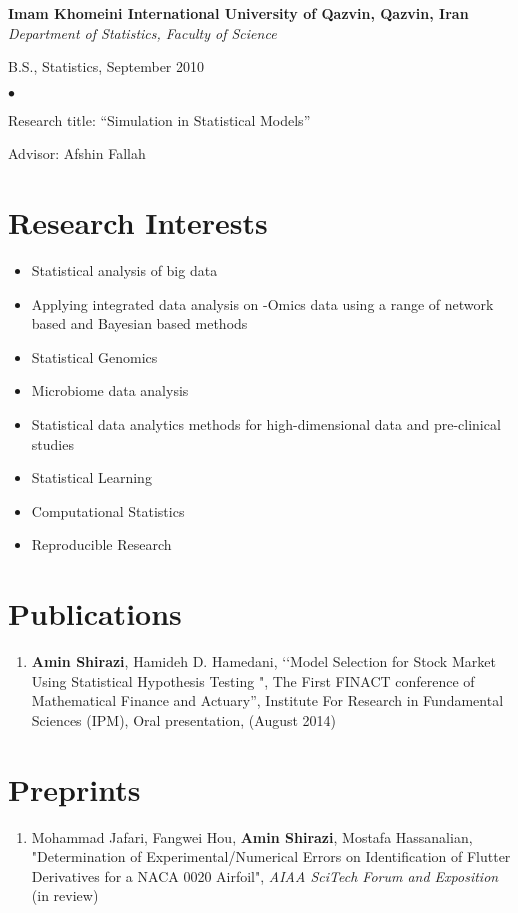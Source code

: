 \documentclass[margin,line]{res}
\newenvironment{list1}{
  \begin{list}{\ding{113}}{%
      \setlength{\itemsep}{0in}
      \setlength{\parsep}{0in} \setlength{\parskip}{0in}
      \setlength{\topsep}{0in} \setlength{\partopsep}{0in}
      \setlength{\leftmargin}{0.17in}}}{\end{list}}
\newenvironment{list2}{
  \begin{list}{$\bullet$}{%
      \setlength{\itemsep}{0in}
      \setlength{\parsep}{0in} \setlength{\parskip}{0in}
      \setlength{\topsep}{0in} \setlength{\partopsep}{0in}
      \setlength{\leftmargin}{0.2in}}}{\end{list}}
\begin{document}
\begin{resume}
{\bf Imam Khomeini International University of Qazvin, Qazvin, Iran} \\
{\em 	Department of Statistics, Faculty of Science}\\
\vspace*{-.1in}
\begin{list1}
	\item[]B.S., Statistics, September 2010
	\begin{list2}
		\vspace*{.05in}
		\item[] Research title:  ``Simulation in Statistical Models''
		\item[] Advisor: Afshin Fallah
	\end{list2}
\end{list1}
\section{\sc Research Interests}
\begin{itemize}
	\item Statistical analysis of big data
	\item Applying integrated data analysis on -Omics data using a range of network based and Bayesian based methods
	\item Statistical Genomics
	\item Microbiome data analysis
	\item Statistical data analytics methods for high-dimensional data and pre-clinical studies
	\item Statistical Learning
	\item Computational Statistics
	\item Reproducible Research
\end{itemize}



\section{\sc Publications }
\begin{enumerate}
		\item \textbf{Amin Shirazi}, Hamideh D. Hamedani, ‘‘Model Selection for Stock Market Using Statistical Hypothesis Testing ", The First FINACT conference of Mathematical Finance and Actuary”, Institute For Research in Fundamental Sciences (IPM), Oral presentation, (August 2014) 
\end{enumerate}
\section{\sc Preprints}	
\begin{enumerate}
		\item  Mohammad Jafari, Fangwei Hou, \textbf{Amin Shirazi}, Mostafa Hassanalian, "Determination of Experimental/Numerical Errors on Identification of Flutter Derivatives for a NACA 0020 Airfoil", \textit{AIAA SciTech Forum and Exposition} (in review)  
\end{enumerate}	

\end{resume}
\end{document}
